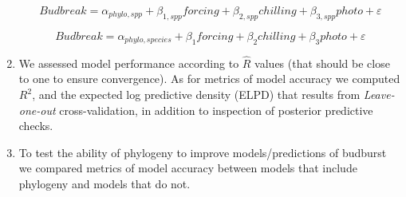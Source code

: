 \documentclass{article}\usepackage[]{graphicx}\usepackage[]{color}
\begin{document}
\begin{enumerate}
\begin{equation} 
\label{eq:3} 
Budbreak = \alpha_{phylo,spp} + \beta_{1,spp}forcing
+ \beta_{2,spp}chilling + \beta_{3,spp}photo + \varepsilon
\end{equation}

\begin{equation} 
\label{eq:4} 
Budbreak = \alpha_{phylo,species} + \beta_{1}forcing
+ \beta_{2}chilling + \beta_{3}photo + \varepsilon
\end{equation}



\item We assessed model performance according to $\hat{R}$ values (that should be close to one to ensure convergence). As for metrics of model accuracy we computed $R^{2}$, and the expected log predictive density (ELPD) that results from \emph{Leave-one-out} cross-validation, in addition to inspection of posterior predictive checks.

\item To test the ability of phylogeny to improve models/predictions of budburst we compared metrics of model accuracy between models that include phylogeny and models that do not.

\end{enumerate}
\end{document}
